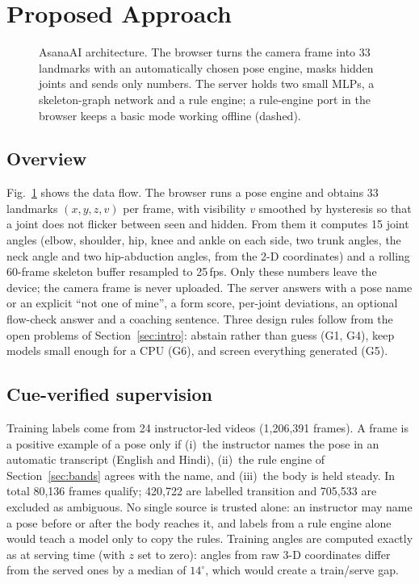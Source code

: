 \section{Proposed Approach}\label{sec:method}
\begin{figure}[t]
\centering
\resizebox{0.98\textwidth}{!}{}
\caption{AsanaAI architecture. The browser turns the camera frame into 33 landmarks with an automatically chosen pose engine, masks hidden joints and sends only numbers. The server holds two small MLPs, a skeleton-graph network and a rule engine; a rule-engine port in the browser keeps a basic mode working offline (dashed).}
\label{fig:arch}
\end{figure}
\subsection{Overview}
Fig.~\ref{fig:arch} shows the data flow. The browser runs a pose engine and obtains 33 landmarks $(x,y,z,v)$ per frame, with visibility $v$ smoothed by hysteresis so that a joint does not flicker between seen and hidden. From them it computes 15 joint angles (elbow, shoulder, hip, knee and ankle on each side, two trunk angles, the neck angle and two hip-abduction angles, from the 2-D coordinates) and a rolling 60-frame skeleton buffer resampled to 25\,fps. Only these numbers leave the device; the camera frame is never uploaded. The server answers with a pose name or an explicit ``not one of mine'', a form score, per-joint deviations, an optional flow-check answer and a coaching sentence. Three design rules follow from the open problems of Section~\ref{sec:intro}: abstain rather than guess (G1, G4), keep models small enough for a CPU (G6), and screen everything generated (G5).

\subsection{Cue-verified supervision}
Training labels come from 24 instructor-led videos (1{,}206{,}391 frames). A frame is a positive example of a pose only if (i)~the instructor names the pose in an automatic transcript \cite{radford2023whisper} (English and Hindi), (ii)~the rule engine of Section~\ref{sec:bands} agrees with the name, and (iii)~the body is held steady. In total 80{,}136 frames qualify; 420{,}722 are labelled transition and 705{,}533 are excluded as ambiguous. No single source is trusted alone: an instructor may name a pose before or after the body reaches it, and labels from a rule engine alone would teach a model only to copy the rules. Training angles are computed exactly as at serving time (with $z$ set to zero): angles from raw 3-D coordinates differ from the served ones by a median of $14^\circ$, which would create a train/serve gap.

